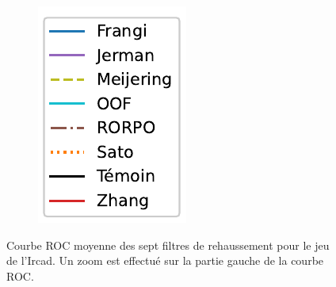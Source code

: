 \begin{figure}[!ht]
\begin{subfigure}[t]{0.2\textwidth}
      \includegraphics[width=\textwidth,clip = true]{Images/standAloneLegend.pdf}
  \end{subfigure}
  \caption{Courbe ROC moyenne des sept filtres de rehaussement pour le jeu de l'Ircad. Un zoom est effectué sur la partie gauche de la courbe ROC.}
  \label{fig:Ircad_ROC}
\end{figure}
